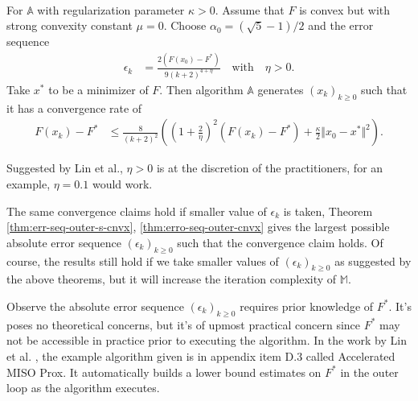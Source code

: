 \documentclass[12pt]{article}
\begin{document}
            \begin{theorem}\label{thm:erro-seq-outer-cnvx}\;\\
                For $\mathbb A$ with regularization parameter $\kappa > 0$. 
                Assume that $F$ is convex but with strong convexity constant $\mu = 0$. 
                Choose $\alpha_0 = (\sqrt{5} - 1)/2$ and the error sequence 
                \begin{align*}
                    \epsilon_k &= \frac{2(F(x_0) - F^*)}{9(k + 2)^{4 + \eta}} \quad 
                    \text{with}\quad \eta > 0. 
                \end{align*}
                Take $x^*$ to be a minimizer of $F$. 
                Then algorithm $\mathbb A$ generates $(x_k)_{k \ge0}$ such that it has a convergence rate of 
                \begin{align*}
                    F(x_k) - F^* &\le 
                    \frac{8}{(k + 2)^2}\left(
                        \left(1 + \frac{2}{\eta}\right)^2(F(x_k) - F^*)
                        + \frac{\kappa}{2}\Vert x_0 - x^*\Vert^2
                    \right).
                \end{align*}
            \end{theorem}
            \begin{remark}
                Suggested by Lin et al., $\eta > 0$ is at the discretion of the practitioners, for an example, $\eta = 0.1$ would work. 
            \end{remark}
            The same convergence claims hold if smaller value of $\epsilon_k$ is taken, Theorem \ref{thm:err-seq-outer-s-cnvx}, \ref{thm:erro-seq-outer-cnvx} gives the largest possible absolute error sequence $(\epsilon_k)_{k \ge 0}$ such that the convergence claim holds. 
            Of course, the results still hold if we take smaller values of $(\epsilon_k)_{k \ge0}$ as suggested by the above theorems, but it will increase the iteration complexity of $\mathbb M$. 
            \par
            Observe the absolute error sequence $(\epsilon_k)_{k \ge 0}$ requires prior knowledge of $F^*$. 
            It's poses no theoretical concerns, but it's of upmost practical concern since $F^*$ may not be accessible in practice prior to executing the algorithm. 
            In the work by Lin et al. \cite{lin_universal_2015}, the example algorithm given is in appendix item D.3 called Accelerated MISO Prox.
            It automatically builds a lower bound estimates on $F^*$ in the outer loop as the algorithm executes.
\end{document}
